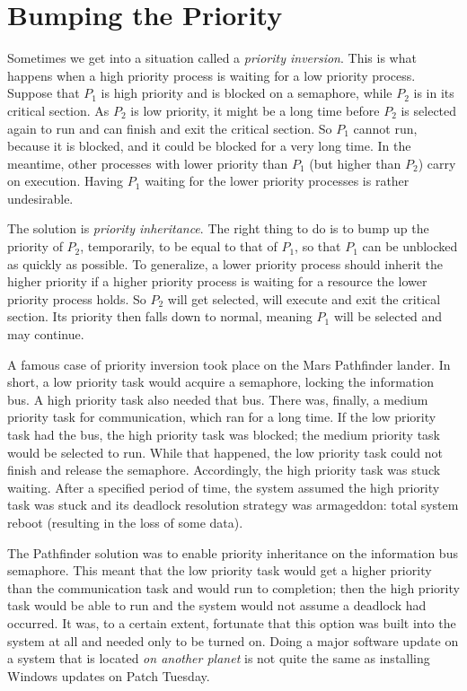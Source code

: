 \section*{Bumping the Priority}
Sometimes we get into a situation called a \textit{priority inversion}. This is what happens when a high priority process is waiting for a low priority process. Suppose that $P_{1}$ is high priority and is blocked on a semaphore, while $P_{2}$ is in its critical section. As $P_{2}$ is low priority, it might be a long time before $P_{2}$ is selected again to run and can finish and exit the critical section. So $P_{1}$ cannot run, because it is blocked, and it could be blocked for a very long time. In the meantime, other processes with lower priority than $P_{1}$ (but higher than $P_{2}$) carry on execution. Having $P_{1}$ waiting for the lower priority processes is rather undesirable.

The solution is \textit{priority inheritance}. The right thing to do is to bump up the priority of $P_{2}$, temporarily, to be equal to that of $P_{1}$, so that $P_{1}$ can be unblocked as quickly as possible. To generalize, a lower priority process should inherit the higher priority if a higher priority process is waiting for a resource the lower priority process holds. So $P_{2}$ will get selected, will execute and exit the critical section. Its priority then falls down to normal, meaning $P_{1}$ will be selected and may continue.

A famous case of priority inversion took place on the Mars Pathfinder lander. In short, a low priority task would acquire a semaphore, locking the information bus. A high priority task also needed that bus. There was, finally, a medium priority task for communication, which ran for a long time. If the low priority task had the bus, the high priority task was blocked; the medium priority task would be selected to run. While that happened, the low priority task could not finish and release the semaphore. Accordingly, the high priority task was stuck waiting. After a specified period of time, the system assumed the high priority task was stuck and its deadlock resolution strategy was armageddon: total system reboot (resulting in the loss of some data). 

The Pathfinder solution was to enable priority inheritance on the information bus semaphore. This meant that the low priority task would get a higher priority than the communication task and would run to completion; then the high priority task would be able to run and the system would not assume a deadlock had occurred. It was, to a certain extent, fortunate that this option was built into the system at all and needed only to be turned on. Doing a major software update on a system that is located \textit{on another planet} is not quite the same as installing Windows updates on Patch Tuesday.

